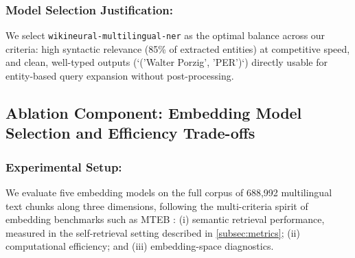 \documentclass[11pt]{article}
\begin{document}
\subsubsection{Model Selection Justification:} We select \texttt{wikineural-multilingual-ner} as the optimal balance across our criteria: high syntactic relevance (85\% of extracted entities) at competitive speed, and clean, well-typed outputs (`('Walter Porzig', 'PER')`) directly usable for entity-based query expansion without post-processing.

\subsection{Ablation Component: Embedding Model Selection and Efficiency Trade-offs}
\label{subsec:exp_embedding}

\subsubsection{Experimental Setup:} We evaluate five embedding models on the full corpus of 688,992 multilingual text chunks along three dimensions, following the multi-criteria spirit of embedding benchmarks such as MTEB \citep{muennighoff2023mteb}: (i) semantic retrieval performance, measured in the self-retrieval setting described in \cref{subsec:metrics}; (ii) computational efficiency; and (iii) embedding-space diagnostics.

\begin{table}[t]
    \centering
    \caption{Comprehensive evaluation of embedding models (self-retrieval protocol; \texttt{multilingual-e5-large} denotes \texttt{intfloat/multilingual-e5-large-instruct}).}
    \label{tab:embedding-comprehensive}
\end{table}
\end{document}
